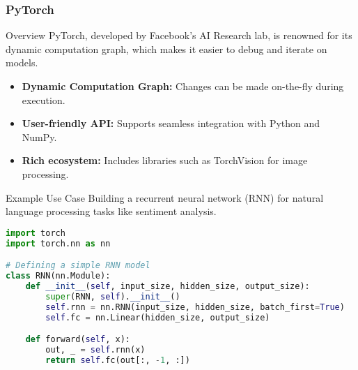 \documentclass{beamer}
\begin{document}
\begin{frame}[fragile]
    \frametitle{PyTorch}
    \begin{block}{Overview}
        PyTorch, developed by Facebook's AI Research lab, is renowned for its dynamic computation graph, which makes it easier to debug and iterate on models.
    \end{block}
    
    \begin{itemize}
        \item \textbf{Dynamic Computation Graph:} Changes can be made on-the-fly during execution.
        \item \textbf{User-friendly API:} Supports seamless integration with Python and NumPy.
        \item \textbf{Rich ecosystem:} Includes libraries such as TorchVision for image processing.
    \end{itemize}

    \begin{block}{Example Use Case}
        Building a recurrent neural network (RNN) for natural language processing tasks like sentiment analysis.
    \end{block}

    \begin{lstlisting}[language=Python]
import torch
import torch.nn as nn

# Defining a simple RNN model
class RNN(nn.Module):
    def __init__(self, input_size, hidden_size, output_size):
        super(RNN, self).__init__()
        self.rnn = nn.RNN(input_size, hidden_size, batch_first=True)
        self.fc = nn.Linear(hidden_size, output_size)

    def forward(self, x):
        out, _ = self.rnn(x)
        return self.fc(out[:, -1, :])
    \end{lstlisting}
\end{frame}
\end{document}
